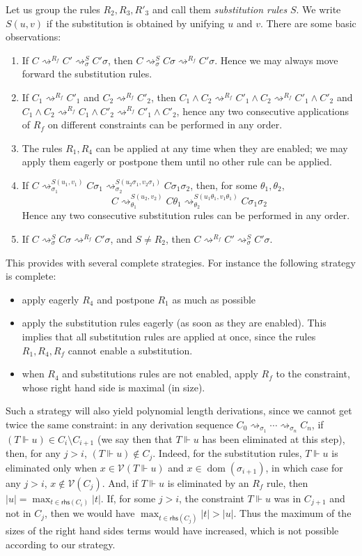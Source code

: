 \documentclass[acmtocl,acmnow]{acmtrans2m}
\newcommand{\var}{\mathcal{V}}
\newcommand{\dom}{\operatorname{dom}}
\newcommand{\rhs}{\mathsf{rhs}}
\newcommand{\simpl}{\rightsquigarrow}   \newcommand{\msimpl}{\rightsquigarrow}  \newcommand{\gsimpl}{\leadsto}
\begin{document}
Let us group the rules $R_2,R_3,R'_3$ and call them \emph{substitution
  rules} $S$. We write $S(u,v)$ if the substitution is obtained by
unifying $u$ and $v$.  There are some basic observations:
\begin{enumerate}
\item \label{obs1} 
If $C \simpl^{R_f} C' \simpl_\sigma^S C'\sigma$, then 
$C \simpl^{S}_\sigma C\sigma \simpl^{R_f} C'\sigma$. Hence we may always move
forward the substitution rules.
\item \label{obs2} 
If $C_1\simpl^{R_f} C'_1$ and $C_2 \simpl^{R_f} C'_2$, then
$C_1 \wedge C_2 \simpl^{R_f} C'_1 \wedge C_2 \simpl^{R_f} C'_1\wedge C'_2$ and
$C_1 \wedge C_2 \simpl^{R_f} C_1 \wedge C'_2 \simpl^{R_f} C'_1\wedge C'_2$,
hence any two consecutive applications of $R_f$ on different constraints
can be performed in any order. 
\item \label{obs3} 
The rules $R_1,R_4$ can be applied
at any time when they are enabled; we may apply them eagerly or postpone
them until no other rule can be applied.
\item \label{obs4} 
If $C \simpl^{S(u_1,v_1)}_{\sigma_1} C\sigma_1 \simpl^{S(u_2\sigma_1,v_2\sigma_1)}_{\sigma_2} C\sigma_1\sigma_2$, then, for some
$\theta_1,\theta_2$, 
\[C \simpl^{S(u_2,v_2)}_{\theta_1} C\theta_1 \simpl^{S(u_1\theta_1,v_1\theta_1)}_{\theta_2} C\sigma_1\sigma_2\] Hence any two consecutive
substitution rules can be performed in any order. 
\item \label{obs5} 
If $C\simpl^S_\sigma C\sigma \simpl^{R_f} C'\sigma$, and $S\neq R_2$,
 then $C\simpl^{R_f} C' \simpl^{S}_\sigma C'\sigma$.
\end{enumerate}

This provides with several complete strategies. For instance the
following strategy is complete:
\begin{itemize}
\item apply eagerly $R_4$ and postpone $R_1$ as much as possible
\item apply the substitution rules eagerly (as soon as they are enabled).
This implies that all substitution rules are applied at once, since the
rules $R_1,R_4,R_f$ cannot enable a substitution.
\item when $R_4$ and substitutions rules are not enabled, apply
$R_f$ to the constraint, whose right hand side is maximal (in size).
\end{itemize}
Such a strategy will also yield polynomial length derivations, since
we cannot get twice the same constraint: in any derivation sequence
$C_0\simpl_{\sigma_1} \cdots \simpl_{\sigma_n} C_n$,
if $(T\Vdash u) \in C_i\setminus C_{i+1}$ (we say then that $T\Vdash u$
has been eliminated at this step), then, for any $j >i$, $(T\Vdash u)\notin C_j$.
Indeed, for the substitution rules, $T\Vdash u$ is eliminated only  when $x\in \var(T\Vdash u)$
and $x\in \dom(\sigma_{i+1})$, in which case for any $j>i$, $x\notin\var(C_j)$.
And, if  $T\Vdash u$ is eliminated by an $R_f$ rule, then
 $|u|=\max_{t\in\rhs(C_i)}|t|$. If, for some $j>i$, the
constraint $T\Vdash u$ was in $C_{j+1}$ and not in  $C_j$, 
 then we would have $\max_{t\in\rhs(C_j)}|t|>|u|$.
Thus the maximum of the sizes of the right hand sides terms would have increased, which is not possible according to our strategy.
\end{document}
